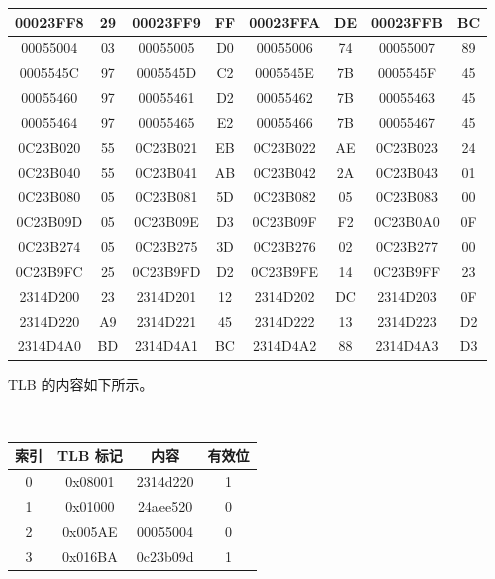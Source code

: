 \begin{problems}
\begin{table}[H]
\begin{tabular}{|c|c|c|c|c|c|c|c|}
                00023FF8 & 29 & 00023FF9 & FF & 00023FFA & DE & 00023FFB & BC \\ \hline
                00055004 & 03 & 00055005 & D0 & 00055006 & 74 & 00055007 & 89 \\ \hline
                0005545C & 97 & 0005545D & C2 & 0005545E & 7B & 0005545F & 45 \\ \hline
                00055460 & 97 & 00055461 & D2 & 00055462 & 7B & 00055463 & 45 \\ \hline
                00055464 & 97 & 00055465 & E2 & 00055466 & 7B & 00055467 & 45 \\ \hline
                0C23B020 & 55 & 0C23B021 & EB & 0C23B022 & AE & 0C23B023 & 24 \\ \hline
                0C23B040 & 55 & 0C23B041 & AB & 0C23B042 & 2A & 0C23B043 & 01 \\ \hline
                0C23B080 & 05 & 0C23B081 & 5D & 0C23B082 & 05 & 0C23B083 & 00 \\ \hline
                0C23B09D & 05 & 0C23B09E & D3 & 0C23B09F & F2 & 0C23B0A0 & 0F \\ \hline
                0C23B274 & 05 & 0C23B275 & 3D & 0C23B276 & 02 & 0C23B277 & 00 \\ \hline
                0C23B9FC & 25 & 0C23B9FD & D2 & 0C23B9FE & 14 & 0C23B9FF & 23 \\ \hline
                2314D200 & 23 & 2314D201 & 12 & 2314D202 & DC & 2314D203 & 0F \\ \hline
                2314D220 & A9 & 2314D221 & 45 & 2314D222 & 13 & 2314D223 & D2 \\ \hline
                2314D4A0 & BD & 2314D4A1 & BC & 2314D4A2 & 88 & 2314D4A3 & D3 \\ \hline
            \end{tabular}
        \end{table}
        TLB 的内容如下所示。
        \begin{table}[H]
            \tt
            \centering
            \begin{tabular}{|c|c|c|c|}
                \hline
                索引 & TLB 标记 & 内容 & 有效位 \\ \hline
                0 & 0x08001 & 2314d220 & 1 \\ \hline
                1 & 0x01000 & 24aee520 & 0 \\ \hline
                2 & 0x005AE & 00055004 & 0 \\ \hline
                3 & 0x016BA & 0c23b09d & 1 \\ \hline

\end{tabular}
\end{table}
\end{problems}

